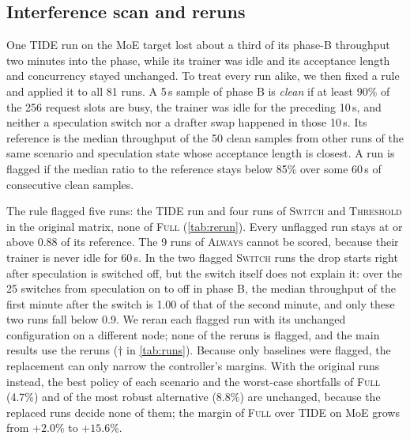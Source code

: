 \documentclass{article}
\newcommand{\pol}[1]{\textsc{#1}}
\begin{document}
\subsection{Interference scan and reruns}\label{app:rerun}

One \pol{TIDE} run on the MoE target lost about a third of its phase-B throughput two minutes into the phase, while its trainer was idle and its acceptance length and concurrency stayed unchanged. To treat every run alike, we then fixed a rule and applied it to all 81 runs. A 5\,s sample of phase B is \emph{clean} if at least 90\% of the 256 request slots are busy, the trainer was idle for the preceding 10\,s, and neither a speculation switch nor a drafter swap happened in those 10\,s. Its reference is the median throughput of the 50 clean samples from other runs of the same scenario and speculation state whose acceptance length is closest. A run is flagged if the median ratio to the reference stays below 85\% over some 60\,s of consecutive clean samples.

The rule flagged five runs: the \pol{TIDE} run and four runs of \pol{Switch} and \pol{Threshold} in the original matrix, none of \pol{Full} (\cref{tab:rerun}). Every unflagged run stays at or above 0.88 of its reference. The 9 runs of \pol{Always} cannot be scored, because their trainer is never idle for 60\,s. In the two flagged \pol{Switch} runs the drop starts right after speculation is switched off, but the switch itself does not explain it: over the 25 switches from speculation on to off in phase B, the median throughput of the first minute after the switch is 1.00 of that of the second minute, and only these two runs fall below 0.9. We reran each flagged run with its unchanged configuration on a different node; none of the reruns is flagged, and the main results use the reruns ($\dagger$ in \cref{tab:runs}). Because only baselines were flagged, the replacement can only narrow the controller's margins. With the original runs instead, the best policy of each scenario and the worst-case shortfalls of \pol{Full} (4.7\%) and of the most robust alternative (8.8\%) are unchanged, because the replaced runs decide none of them; the margin of \pol{Full} over \pol{TIDE} on MoE grows from $+2.0$\% to $+15.6$\%.
\end{document}
